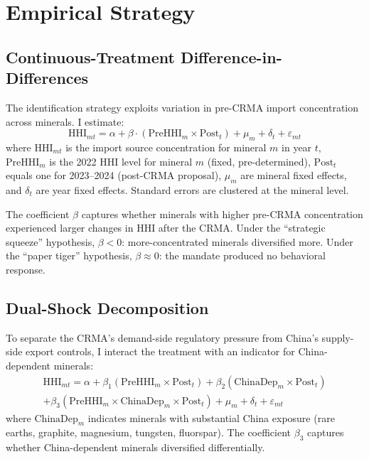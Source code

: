 \documentclass[12pt]{article}
\begin{document}



\section{Empirical Strategy}

\subsection{Continuous-Treatment Difference-in-Differences}

The identification strategy exploits variation in pre-CRMA import concentration across minerals. I estimate:
\begin{equation}
\text{HHI}_{mt} = \alpha + \beta \cdot (\text{PreHHI}_m \times \text{Post}_t) + \mu_m + \delta_t + \varepsilon_{mt}
\label{eq:main}
\end{equation}
where $\text{HHI}_{mt}$ is the import source concentration for mineral $m$ in year $t$, $\text{PreHHI}_m$ is the 2022 HHI level for mineral $m$ (fixed, pre-determined), $\text{Post}_t$ equals one for 2023--2024 (post-CRMA proposal), $\mu_m$ are mineral fixed effects, and $\delta_t$ are year fixed effects. Standard errors are clustered at the mineral level.

The coefficient $\beta$ captures whether minerals with higher pre-CRMA concentration experienced larger changes in HHI after the CRMA. Under the ``strategic squeeze'' hypothesis, $\beta < 0$: more-concentrated minerals diversified more. Under the ``paper tiger'' hypothesis, $\beta \approx 0$: the mandate produced no behavioral response.

\subsection{Dual-Shock Decomposition}

To separate the CRMA's demand-side regulatory pressure from China's supply-side export controls, I interact the treatment with an indicator for China-dependent minerals:
\begin{multline}
\text{HHI}_{mt} = \alpha + \beta_1 (\text{PreHHI}_m \times \text{Post}_t) + \beta_2 (\text{ChinaDep}_m \times \text{Post}_t) \\
+ \beta_3 (\text{PreHHI}_m \times \text{ChinaDep}_m \times \text{Post}_t) + \mu_m + \delta_t + \varepsilon_{mt}
\end{multline}
where $\text{ChinaDep}_m$ indicates minerals with substantial China exposure (rare earths, graphite, magnesium, tungsten, fluorspar). The coefficient $\beta_3$ captures whether China-dependent minerals diversified differentially.
\end{document}
